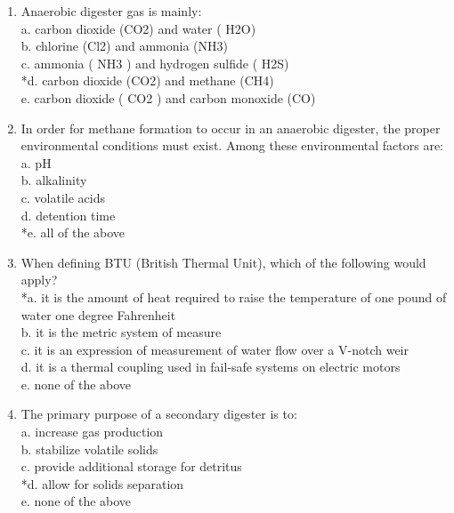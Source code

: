 \documentclass{article}
\begin{document}
\begin{enumerate}
\item  Anaerobic digester gas is mainly: \\

a. carbon dioxide (CO2) and water ( H2O) \\
b. chlorine (Cl2) and ammonia (NH3) \\
c. ammonia ( NH3 ) and hydrogen sulfide ( H2S) \\
*d. carbon dioxide (CO2) and methane (CH4) \\
e. carbon dioxide ( CO2 ) and carbon monoxide (CO) \\

\item  In order for methane formation to occur in an anaerobic digester, the proper environmental conditions must exist.  Among these environmental factors are: \\

a. pH \\
b. alkalinity \\
c. volatile acids \\
d. detention time \\
*e. all of the above \\

\item  When defining BTU (British Thermal Unit), which of the following would apply? \\

*a. it is the amount of heat required to raise the temperature of one pound of water one degree Fahrenheit \\
b. it is the metric system of measure \\
c. it is an expression of measurement of water flow over a V-notch weir \\
d. it is a thermal coupling used in fail-safe systems on electric motors \\
e. none of the above \\

\item  The primary purpose of a secondary digester is to: \\

a. increase gas production \\
b. stabilize volatile solids \\
c. provide additional storage for detritus \\
*d. allow for solids separation \\
e. none of the above \\


\end{enumerate}
\end{document}
